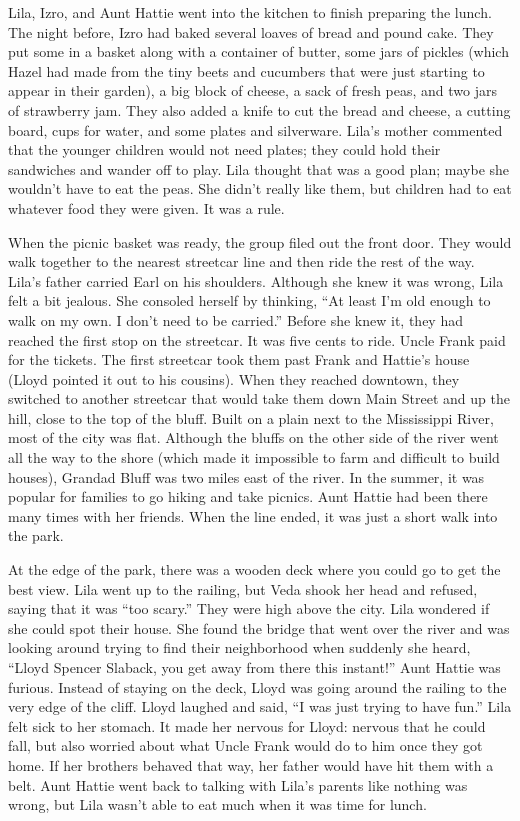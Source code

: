 \documentclass[
  letterpaper,
]{book}
\begin{document}
Lila, Izro, and Aunt Hattie went into the kitchen to finish preparing
the lunch. The night before, Izro had baked several loaves of bread and
pound cake. They put some in a basket along with a container of butter,
some jars of pickles (which Hazel had made from the tiny beets and
cucumbers that were just starting to appear in their garden), a big
block of cheese, a sack of fresh peas, and two jars of strawberry jam.
They also added a knife to cut the bread and cheese, a cutting board,
cups for water, and some plates and silverware. Lila's mother commented
that the younger children would not need plates; they could hold their
sandwiches and wander off to play. Lila thought that was a good plan;
maybe she wouldn't have to eat the peas. She didn't really like them,
but children had to eat whatever food they were given. It was a rule.

When the picnic basket was ready, the group filed out the front door.
They would walk together to the nearest streetcar line and then ride the
rest of the way. Lila's father carried Earl on his shoulders. Although
she knew it was wrong, Lila felt a bit jealous. She consoled herself by
thinking, ``At least I'm old enough to walk on my own. I don't need to
be carried.'' Before she knew it, they had reached the first stop on the
streetcar. It was five cents to ride. Uncle Frank paid for the tickets.
The first streetcar took them past Frank and Hattie's house (Lloyd
pointed it out to his cousins). When they reached downtown, they
switched to another streetcar that would take them down Main Street and
up the hill, close to the top of the bluff. Built on a plain next to the
Mississippi River, most of the city was flat. Although the bluffs on the
other side of the river went all the way to the shore (which made it
impossible to farm and difficult to build houses), Grandad Bluff was two
miles east of the river. In the summer, it was popular for families to
go hiking and take picnics. Aunt Hattie had been there many times with
her friends. When the line ended, it was just a short walk into the
park.

At the edge of the park, there was a wooden deck where you could go to
get the best view. Lila went up to the railing, but Veda shook her head
and refused, saying that it was ``too scary.'' They were high above the
city. Lila wondered if she could spot their house. She found the bridge
that went over the river and was looking around trying to find their
neighborhood when suddenly she heard, ``Lloyd Spencer Slaback, you get
away from there this instant!'' Aunt Hattie was furious. Instead of
staying on the deck, Lloyd was going around the railing to the very edge
of the cliff. Lloyd laughed and said, ``I was just trying to have fun.''
Lila felt sick to her stomach. It made her nervous for Lloyd: nervous
that he could fall, but also worried about what Uncle Frank would do to
him once they got home. If her brothers behaved that way, her father
would have hit them with a belt. Aunt Hattie went back to talking with
Lila's parents like nothing was wrong, but Lila wasn't able to eat much
when it was time for lunch.
\end{document}
